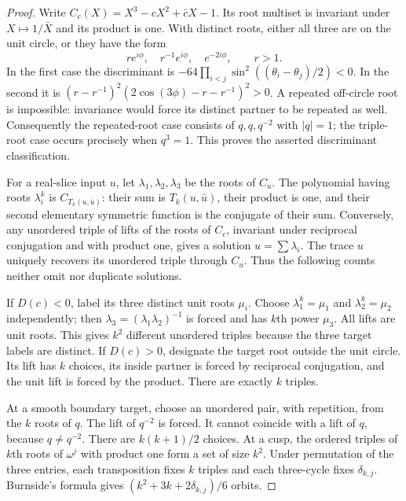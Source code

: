 \documentclass[UTF8,11pt]{ctexart}
\theoremstyle{definition}
\numberwithin{equation}{section}
\begin{document}
\begin{proof}
Write $C_c(X)=X^3-cX^2+\bar cX-1$. Its root multiset is
invariant under $X\mapsto1/\bar X$ and its product is one.
With distinct roots, either all three are on the unit circle,
or they have the form
\[
 r e^{i\phi},\quad r^{-1}e^{i\phi},\quad e^{-2i\phi},
 \qquad r>1.
\]
In the first case the discriminant is
$-64\prod_{i<j}\sin^2((\theta_i-\theta_j)/2)<0$.
In the second it is
$(r-r^{-1})^2(2\cos(3\phi)-r-r^{-1})^2>0$.
A repeated off-circle root is impossible: invariance would force
its distinct partner to be repeated as well. Consequently the
repeated-root case consists of $q,q,q^{-2}$ with $|q|=1$;
the triple-root case occurs precisely when $q^3=1$.
This proves the asserted discriminant classification.

For a real-slice input $u$, let $\lambda_1,\lambda_2,\lambda_3$
be the roots of $C_u$. The polynomial having roots $\lambda_i^k$
is $C_{T_k(u,\bar u)}$: their sum is $T_k(u,\bar u)$, their
product is one, and their second elementary symmetric function
is the conjugate of their sum. Conversely, any unordered
triple of lifts of the roots of $C_c$, invariant under reciprocal
conjugation and with product one, gives a solution $u=\sum\lambda_i$.
The trace $u$ uniquely recovers its unordered triple through $C_u$.
Thus the following counts neither omit nor duplicate solutions.

If $D(c)<0$, label its three distinct unit roots $\mu_i$.
Choose $\lambda_1^k=\mu_1$ and $\lambda_2^k=\mu_2$ independently;
then $\lambda_3=(\lambda_1\lambda_2)^{-1}$ is forced and has
$k$th power $\mu_3$. All lifts are unit roots. This gives $k^2$
different unordered triples because the three target labels
are distinct. If $D(c)>0$, designate the target root outside
the unit circle. Its lift has $k$ choices, its inside partner
is forced by reciprocal conjugation, and the unit lift is
forced by the product. There are exactly $k$ triples.

At a smooth boundary target, choose an unordered pair, with
repetition, from the $k$ roots of $q$. The lift of $q^{-2}$
is forced. It cannot coincide with a lift of $q$, because
$q\ne q^{-2}$. There are $k(k+1)/2$ choices.
At a cusp, the ordered triples of $k$th roots of $\omega^j$
with product one form a set of size $k^2$.
Under permutation of the three entries, each transposition
fixes $k$ triples and each three-cycle fixes $\delta_{k,j}$.
Burnside's formula gives $(k^2+3k+2\delta_{k,j})/6$ orbits.


\end{proof}
\end{document}
